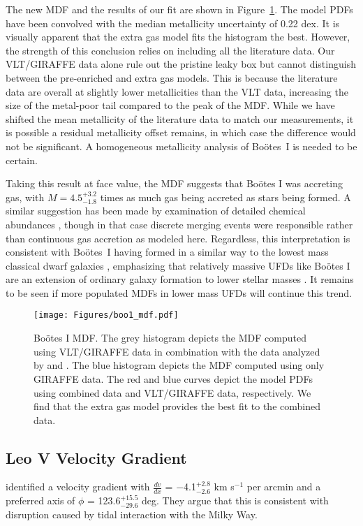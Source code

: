 \documentclass[twocolumn]{aastex63}
\begin{document}
The new MDF and the results of our fit are shown in Figure~\ref{fig:boo1mdf}.
The model PDFs have been convolved with the median metallicity uncertainty of 0.22 dex. It is visually apparent that the extra gas model fits the histogram the best.
However, the strength of this conclusion relies on including all the literature data. Our VLT/GIRAFFE data alone rule out the pristine leaky box but cannot distinguish between the pre-enriched and extra gas models.
This is because the literature data are overall at slightly lower metallicities than the VLT data, increasing the size of the metal-poor tail compared to the peak of the MDF. While we have shifted the mean metallicity of the literature data to match our measurements, it is possible a residual metallicity offset remains, in which case the difference would not be significant. A homogeneous metallicity analysis of Bo{\"o}tes~I is needed to be certain.

Taking this result at face value, the MDF suggests that Bo{\"o}tes I was accreting gas, with $M=4.5^{+3.2}_{-1.8}$ times as much gas being accreted as stars being formed. A similar suggestion has been made by examination of detailed chemical abundances \citep{frebel16}, though in that case discrete merging events were responsible rather than continuous gas accretion as modeled here. 
Regardless, this interpretation is consistent with Bo{\"o}tes~I having formed in a similar way to the lowest mass classical dwarf galaxies \citep{kir2011,zhi2020}, emphasizing that relatively massive UFDs like Bo{\"o}tes I are an extension of ordinary galaxy formation to lower stellar masses \citep{tolstoy09,Simon2019ARA&A..57..375S}.
It remains to be seen if more populated MDFs in lower mass UFDs will continue this trend.
\begin{figure}
    \centering
    \texttt{[image: Figures/boo1\_mdf.pdf]}
    \caption{Bo{\"o}tes I MDF. The grey histogram depicts the MDF computed using VLT/GIRAFFE data in combination with the data analyzed by  \citet{nor2010} and \citet{lai2011}. The blue histogram depicts the MDF computed using only GIRAFFE data. The red and blue curves depict the model PDFs using combined data and VLT/GIRAFFE data, respectively. We find that the extra gas model provides the best fit to the combined data. }
    \label{fig:boo1mdf}
\end{figure}
\subsection{Leo V Velocity Gradient} 
\label{sec:leov_gradient}
\citet{col2017} identified a velocity gradient with $\frac{dv}{dx}$ = $-$4.1$^{+2.8}_{-2.6}$ km s$^{-1}$ per arcmin and a preferred axis of $\phi$ = 123.6$^{+15.5}_{-29.6}$ deg. They argue that this is consistent with disruption caused by tidal interaction with the Milky Way.
\end{document}
